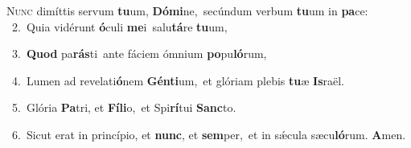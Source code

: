 \lettrine{\initial\textcolor{\initialcolor}{N}}{unc} dimíttis servum \textbf{tu}\-um, \textbf{Dó}\-\textbf{mi}ne,~\star secúndum verbum \textbf{tu}\-um in \textbf{pa}\-ce:\\
{\numbfont\textcolor{\numbcolor}{~2.}}~Quia vidérunt \textbf{ó}\-culi \textbf{me}\-i~\star salu\-\textbf{tá}\-re \textbf{tu}\-um,\par
{\numbfont\textcolor{\numbcolor}{~3.}}~\textbf{Quod} pa\-\textbf{rás}\-ti~\star ante fáciem ómnium \textbf{po}\-pu\-\textbf{ló}\-rum,\par
{\numbfont\textcolor{\numbcolor}{~4.}}~Lumen ad revelati\-\textbf{ó}\-nem \textbf{Gén}\-\textbf{ti}um,~\star et glóriam plebis \textbf{tu}\-æ \textbf{Is}\-raël.\par
{\numbfont\textcolor{\numbcolor}{~5.}}~Glória \textbf{Pa}\-tri, et \textbf{Fí}\-\textbf{li}o,~\star et Spi\-\textbf{rí}\-tui \textbf{Sanc}\-to.\par
{\numbfont\textcolor{\numbcolor}{~6.}}~Sicut erat in princípio, et \textbf{nunc}\-, et \textbf{sem}\-per,~\star et in sǽcula sæcu\-\textbf{ló}\-rum. \textbf{A}\-men.\par
